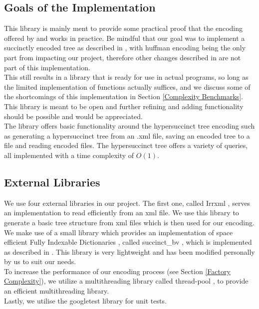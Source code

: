 \documentclass{article}
\begin{document}
\subsection{Goals of the Implementation} \label{Goals of the Implementation}
This library is mainly ment to provide some practical proof that the encoding offered by \cite{farzanMunro} and \cite{universalSuccinct} works in practice. Be mindful that our goal was to implement a succinctly encoded tree as described in \cite{farzanMunro}, with huffman encoding being the only part from \cite{universalSuccinct} impacting our project, therefore other changes described in \cite{universalSuccinct} are not part of this implementation.\\
This still results in a library that is ready for use in actual programs, so long as the limited implementation of functions actually suffices, and we discuss some of the shortcomings of this implementation in Section \ref{Complexity Benchmarks}. This library is meant to be open and further refining and adding functionality should be possible and would be appreciated.\\
The library offers basic functionality around the hypersuccinct tree encoding such as generating a hypersuccinct tree from an .xml file, saving an encoded tree to a file and reading encoded files. The hypersuccinct tree offers a variety of queries, all implemented with a time complexity of $O(1)$.

\subsection{External Libraries} \label{External Libraries}
We use four external libraries in our project.
The first one, called Irrxml \cite{irrXMLLink}, serves an implementation to read efficiently from an xml file. We use this library to generate a basic tree structure from xml files which is then used for our encoding.\\
We make use of a small library which provides an implementation of space efficient Fully Indexable Dictionaries \cite{universalSuccinct}, called succinct\_bv \cite{succinctBVLink}, which is implemented as described in \cite{succinctBV}.
This library is very lightweight and has been modified personally by us to suit our needs.\\
To increase the performance of our encoding process (see Section \ref{Factory Complexity}), we utilize a multithreading library called thread-pool \cite{threading}, to provide an efficient multithreading library.\\
Lastly, we utilise the googletest library \cite{googletestLink} for unit tests.
\end{document}
